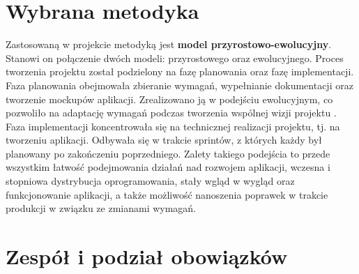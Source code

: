 \section{Wybrana metodyka}

\indent
Zastosowaną w projekcie metodyką jest \textbf{model przyrostowo-ewolucyjny}. Stanowi on połączenie dwóch modeli: przyrostowego oraz ewolucyjnego. Proces tworzenia projektu został podzielony na fazę planowania oraz fazę implementacji.
Faza planowania obejmowała zbieranie wymagań, wypełnianie dokumentacji oraz tworzenie mockupów aplikacji. Zrealizowano ją w podejściu ewolucyjnym, co pozwoliło na adaptację wymagań podczas tworzenia wspólnej wizji projektu \cite{roger2004}.
Faza implementacji koncentrowała się na technicznej realizacji projektu, tj. na tworzeniu aplikacji. Odbywała się w trakcie sprintów, z których każdy był planowany po zakończeniu poprzedniego.
Zalety takiego podejścia to przede wszystkim łatwość podejmowania działań nad rozwojem aplikacji, wczesna i stopniowa dystrybucja oprogramowania, stały wgląd w wygląd oraz funkcjonowanie aplikacji, a także możliwość nanoszenia poprawek w trakcie produkcji w związku ze zmianami wymagań.

\section{Zespół i podział obowiązków}





